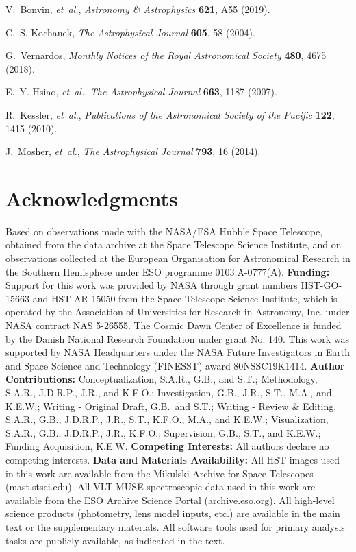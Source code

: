 \documentclass[12pt]{article}
\begin{document}
\begin{thebibliography}{10}
V.~Bonvin, {\it et~al.\/}, {\it Astronomy \& Astrophysics\/} {\bf 621}, A55
  (2019).

C.~S. Kochanek, {\it The Astrophysical Journal\/} {\bf 605}, 58 (2004).

G.~Vernardos, {\it Monthly Notices of the Royal Astronomical Society\/} {\bf
  480}, 4675 (2018).

E.~Y. Hsiao, {\it et~al.\/}, {\it The Astrophysical Journal\/} {\bf 663}, 1187
  (2007).

R.~Kessler, {\it et~al.\/}, {\it Publications of the Astronomical Society of
  the Pacific\/} {\bf 122}, 1415 (2010).

J.~Mosher, {\it et~al.\/}, {\it The Astrophysical Journal\/} {\bf 793}, 16
  (2014).

\end{thebibliography}



\section*{Acknowledgments}

Based on observations made with the NASA/ESA Hubble Space Telescope, obtained from the data archive at the Space Telescope Science Institute, and on observations collected at the European Organisation for Astronomical Research in the Southern Hemisphere under ESO programme 0103.A-0777(A).  
{\bf Funding:} Support for this work was provided by NASA through grant numbers HST-GO-15663 and HST-AR-15050 from the Space Telescope Science Institute, which is operated by the Association of Universities for Research in Astronomy, Inc. under NASA contract NAS 5-26555.  The Cosmic Dawn Center of Excellence is funded by the Danish National Research Foundation under grant No. 140. This work was supported by NASA Headquarters under the NASA Future Investigators in Earth and Space Science and Technology (FINESST) award 80NSSC19K1414. 
{\bf Author Contributions:} 
Conceptualization, S.A.R., G.B., and S.T.; Methodology, S.A.R., J.D.R.P., J.R., and K.F.O.; Investigation, G.B., J.R., S.T., M.A., and K.E.W.; Writing - Original Draft, G.B.\ and S.T.; Writing - Review \& Editing, S.A.R., G.B., J.D.R.P., J.R., S.T., K.F.O., M.A., and K.E.W.; Visualization, S.A.R., G.B., J.D.R.P., J.R., K.F.O.; Supervision, G.B., S.T., and K.E.W.; Funding Acquisition, K.E.W.
{\bf Competing Interests:} All authors declare no competing interests.
{\bf Data and Materials Availability:} All HST images used in this work are available from the Mikulski Archive for Space Telescopes (mast.stsci.edu). All VLT MUSE spectroscopic data used in this work are available from  the ESO Archive Science Portal (archive.eso.org).  All high-level science products (photometry, lens model inputs, etc.) are available in the main text or the supplementary materials.  All software tools used for primary analysis tasks are publicly available, as indicated in the text.
\end{document}
